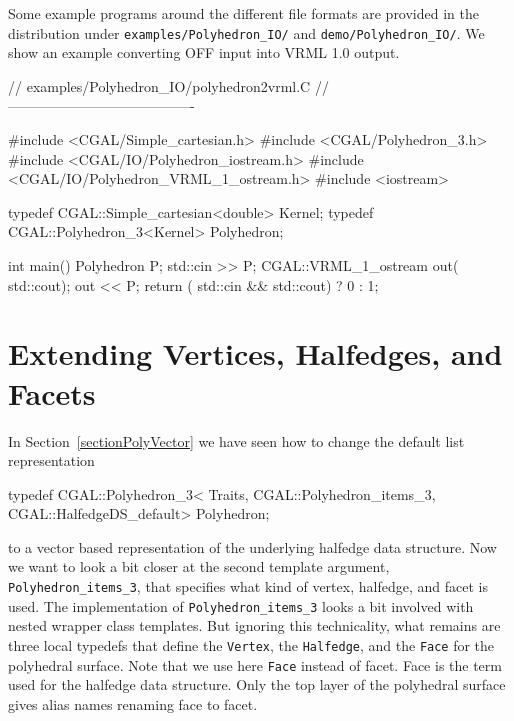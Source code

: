 Some example programs around the different file formats are provided
in the distribution under \texttt{examples/Polyhedron\_IO/} and
\texttt{demo/Polyhedron\_IO/}. We show an example converting OFF input
into VRML 1.0 output.

\begin{ccExampleCode}
// examples/Polyhedron_IO/polyhedron2vrml.C
// ----------------------------------------

#include <CGAL/Simple_cartesian.h>
#include <CGAL/Polyhedron_3.h>
#include <CGAL/IO/Polyhedron_iostream.h>
#include <CGAL/IO/Polyhedron_VRML_1_ostream.h> 
#include <iostream>

typedef CGAL::Simple_cartesian<double> Kernel;
typedef CGAL::Polyhedron_3<Kernel>     Polyhedron;

int main() {
    Polyhedron P;
    std::cin >> P;
    CGAL::VRML_1_ostream out( std::cout);
    out << P;
    return ( std::cin && std::cout) ? 0 : 1;
}
\end{ccExampleCode}



\section{Extending Vertices, Halfedges, and Facets}
\label{sectionPolyExtend}

In Section~\ref{sectionPolyVector} we have seen how to change the 
default list representation

\begin{ccExampleCode}
typedef CGAL::Polyhedron_3< Traits, 
                            CGAL::Polyhedron_items_3, 
                            CGAL::HalfedgeDS_default>      Polyhedron;
\end{ccExampleCode}

to a vector based representation of the underlying halfedge data
structure. Now we want to look a bit closer at the second template argument,
\texttt{Polyhedron\_items\_3}, that specifies what kind of vertex, 
halfedge, and facet is used. The implementation of 
\texttt{Polyhedron\_items\_3} looks a bit involved with nested 
wrapper class templates. But ignoring this technicality, what remains
are three local typedefs that define the \texttt{Vertex}, the
\texttt{Halfedge}, and the \texttt{Face} for the polyhedral surface.
Note that we use here \texttt{Face} instead of facet. Face is the term
used for the halfedge data structure. Only the top layer of the
polyhedral surface gives alias names renaming face to facet.

